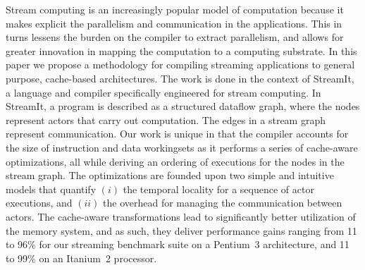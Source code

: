 
Stream computing is an increasingly popular model of computation
because it makes explicit the parallelism and communication in the
applications. This in turns lessens the burden on the compiler to
extract parallelism, and allows for greater innovation in mapping the
computation to a computing substrate. In this paper we propose a
methodology for compiling streaming applications to general purpose,
cache-based architectures. The work is done in the context of
StreamIt, a language and compiler specifically engineered for stream
computing. In StreamIt, a program is described as a structured dataflow
graph, where the nodes represent actors that carry out 
computation. The edges in a stream graph represent
communication. Our work is unique in that the compiler
accounts for the size of instruction and data workingsets as it
performs a series of cache-aware optimizations, all while deriving an
ordering of executions for the nodes in the stream graph. The
optimizations are founded upon two simple and intuitive models that
quantify $(i)$ the temporal locality for a sequence of  actor
executions, and $(ii)$ the overhead for managing the communication
between actors. The cache-aware transformations lead to significantly
better utilization of the memory system, and as such, they deliver
performance gains ranging from 11 to 96\% for our streaming
benchmark suite on a Pentium~3 architecture, and 11 to 99\% on an
Itanium~2 processor.
